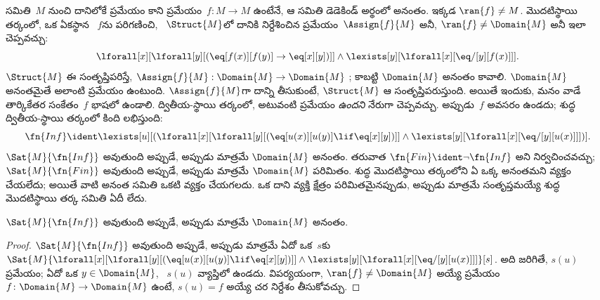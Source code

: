 \documentclass[../../../include/open-logic-section]{subfiles}
\begin{document}


సమితి~$M$ నుంచి దానిలోకే  ప్రమేయం కాని
 ప్రమేయం~$f\colon M \to M$ ఉంటేనే, ఆ సమితి
డెడెకిండ్ అర్థంలో అనంతం. ఇక్కడ $\ran{f} \neq M$. మొదటిస్థాయి తర్కంలో, ఒక ఏకస్థాన
~$f$ను పరిగణించి, ~$\Struct{M}$లో దానికి
నిర్దేశించిన ప్రమేయం~$\Assign{f}{M}$  అనీ,
$\ran{f} \neq \Domain{M}$ అనీ ఇలా చెప్పవచ్చు:
\[
\lforall[x][\lforall[y][(\eq[f(x)][f(y)] \to \eq[x][y])]] \land
\lexists[y][\lforall[x][\eq/[y][f(x)]]].
\]
$\Struct{M}$ ఈ  సంతృప్తిపరిస్తే, $\Assign{f}{M}:
\Domain{M} \to \Domain{M}$ ; కాబట్టి $\Domain{M}$
అనంతం కావాలి. $\Domain{M}$ అనంతమైతే అలాంటి ప్రమేయం ఉంటుంది.
$\Assign{f}{M}$గా దాన్ని తీసుకుంటే, $\Struct{M}$ ఆ
 సంతృప్తిపరుస్తుంది. అయితే ఇందుకు,
మనం వాడే తార్కికేతర సంకేతం~$f$ భాషలో ఉండాలి. ద్వితీయ-స్థాయి
తర్కంలో, అటువంటి ప్రమేయం \emph{ఉందని} నేరుగా చెప్పవచ్చు. అప్పుడు~$f$
అవసరం ఉండదు; శుద్ధ ద్వితీయ-స్థాయి తర్కంలో కింది  లభిస్తుంది:
\[
\fn{Inf} \ident \lexists[u][(\lforall[x][\lforall[y][(\eq[u(x)][u(y)]
      \lif \eq[x][y])]] \land \lexists[y][\lforall[x][\eq/[y][u(x)]]])].
\]
$\Sat{M}{\fn{Inf}}$ అవుతుంది అప్పుడే, అప్పుడు మాత్రమే $\Domain{M}$
అనంతం. తరువాత $\fn{Fin} \ident \lnot \fn{Inf}$ అని నిర్వచించవచ్చు;
$\Sat{M}{\fn{Fin}}$ అవుతుంది అప్పుడే, అప్పుడు మాత్రమే $\Domain{M}$
పరిమితం. శుద్ధ మొదటిస్థాయి తర్కంలోని ఏ ఒక్క 
 అనంతమని వ్యక్తం చేయలేదు; అయితే వాటి అనంత సమితి ఒకటి
వ్యక్తం చేయగలదు. ఒక  దాని వ్యక్తి క్షేత్రం పరిమితమైనప్పుడు,
అప్పుడు మాత్రమే సంతృప్తమయ్యే శుద్ధ మొదటిస్థాయి తర్క
 సమితి ఏదీ లేదు.

\begin{prop}
$\Sat{M}{\fn{Inf}}$ అవుతుంది అప్పుడే, అప్పుడు మాత్రమే $\Domain{M}$
అనంతం.
\end{prop}

\begin{proof}
$\Sat{M}{\fn{Inf}}$ అవుతుంది అప్పుడే, అప్పుడు మాత్రమే ఏదో ఒక~$s$కు
  $\Sat{M}{\lforall[x][\lforall[y][(\eq[u(x)][u(y)] \lif \eq[x][y])]]
    \land \lexists[y][\lforall[x][\eq/[y][u(x)]]]}[s]$.
  అది జరిగితే, $s(u)$  ప్రమేయం; ఏదో ఒక $y
  \in \Domain{M}$, ~$s(u)$ వ్యాప్తిలో ఉండదు. విపర్యయంగా,
  $\ran{f} \neq \Domain{M}$ అయ్యే  ప్రమేయం
$f\colon \Domain{M} \to \Domain{M}$ ఉంటే, $s(u) = f$ అయ్యే చర
నిర్దేశం తీసుకోవచ్చు.
\end{proof}
\end{document}
